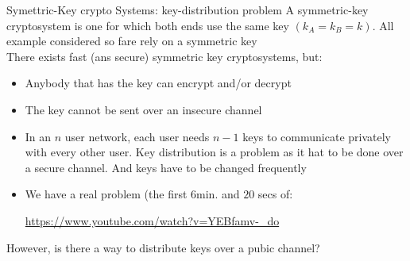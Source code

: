\begin{parag}{Symettric-Key crypto Systems: key-distribution problem}
         A symmetric-key cryptosystem is one for which both ends use the same key $(k_A = k_B=k)$. All example considered so fare rely on a symmetric key\\
         There exists fast (ans secure) symmetric key cryptosystems, but:
         \begin{itemize}
             \item Anybody that has the key can encrypt and/or decrypt
             \item The key cannot be sent over an insecure channel
             \item In an $n$ user network, each user needs $n-1$ keys to communicate privately with every other user. Key distribution is a problem as it hat to be done over a secure channel. And keys have to be changed frequently
             \item We have a real problem (the first $6$min. and $20$ secs of:
                 \begin{center}
                 \url{https://www.youtube.com/watch?v=YEBfamv-_do}
                 \end{center}
                 
                 
         \end{itemize}
         However, is there a way to distribute keys over a pubic channel?
\end{parag}
